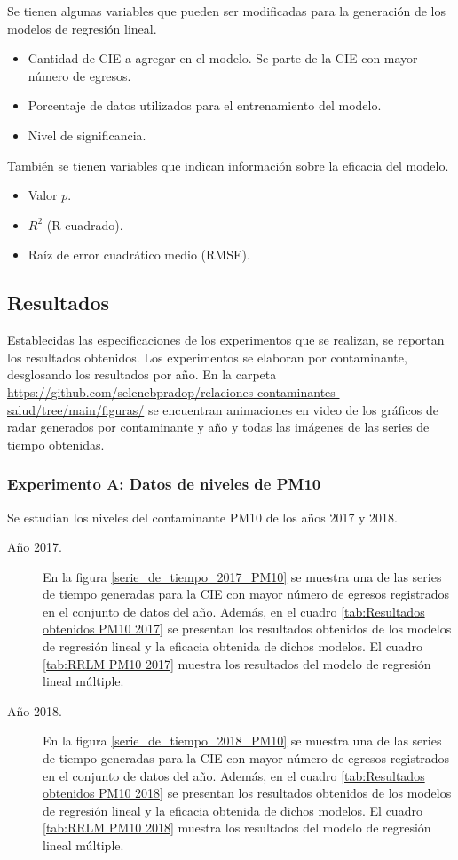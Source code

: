 \documentclass[3p,times]{elsarticle}
\begin{document}
Se tienen algunas variables que pueden ser modificadas para la generación de los modelos de regresión lineal.

\begin{itemize}
	\item Cantidad de CIE a agregar en el modelo. Se parte de la CIE con mayor número de egresos.
	\item Porcentaje de datos utilizados para el entrenamiento del modelo.
	\item Nivel de significancia.
\end{itemize}

También se tienen variables que indican información sobre la eficacia del modelo.

\begin{itemize}
	\item Valor $p$.
	\item $R^2$ (R cuadrado).
	\item Raíz de error cuadrático medio (RMSE).
\end{itemize}


\subsection{Resultados}
Establecidas las especificaciones de los experimentos que se realizan, se reportan los resultados obtenidos. Los experimentos se elaboran por contaminante, desglosando los resultados por año. En la carpeta \url{https://github.com/selenebpradop/relaciones-contaminantes-salud/tree/main/figuras/} se encuentran animaciones en video de los gráficos de radar generados por contaminante y año y todas las imágenes de las series de tiempo obtenidas.

\subsubsection{Experimento A: Datos de niveles de PM10}
Se estudian los niveles del contaminante PM10 de los años 2017 y 2018. 

\begin{description}
\item[Año 2017.]{En la figura \ref{serie_de_tiempo_2017_PM10} se muestra una de las series de tiempo generadas para la CIE con mayor número de egresos registrados en el conjunto de datos del año. Además, en el cuadro \ref{tab:Resultados obtenidos PM10 2017} se presentan los resultados obtenidos de los modelos de regresión lineal y la eficacia obtenida de dichos modelos. El cuadro \ref{tab:RRLM PM10 2017} muestra los resultados del modelo de regresión lineal múltiple.}

\item[Año 2018.]{En la figura \ref{serie_de_tiempo_2018_PM10} se muestra una de las series de tiempo generadas para la CIE con mayor número de egresos registrados en el conjunto de datos del año. Además, en el cuadro \ref{tab:Resultados obtenidos PM10 2018} se presentan los resultados obtenidos de los modelos de regresión lineal y la eficacia obtenida de dichos modelos. El cuadro \ref{tab:RRLM PM10 2018} muestra los resultados del modelo de regresión lineal múltiple.}
\end{description}
\end{document}

